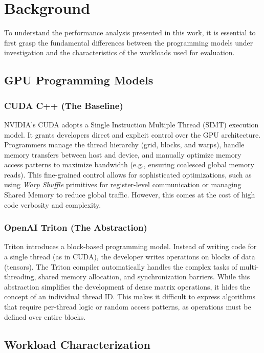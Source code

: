 \section{Background}\label{sec:background}

To understand the performance analysis presented in this work, it is essential to first grasp the fundamental differences between the programming models under investigation and the characteristics of the workloads used for evaluation.

\subsection{GPU Programming Models}

\subsubsection{CUDA C++ (The Baseline)}
NVIDIA's CUDA \cite{cuda} adopts a Single Instruction Multiple Thread (SIMT) execution model. It grants developers direct and explicit control over the GPU architecture. Programmers manage the thread hierarchy (grid, blocks, and warps), handle memory transfers between host and device, and manually optimize memory access patterns to maximize bandwidth (e.g., ensuring coalesced global memory reads).
This fine-grained control allows for sophisticated optimizations, such as using \textit{Warp Shuffle} primitives for register-level communication or managing Shared Memory to reduce global traffic. However, this comes at the cost of high code verbosity and complexity.

\subsubsection{OpenAI Triton (The Abstraction)}
Triton \cite{triton} introduces a block-based programming model. Instead of writing code for a single thread (as in CUDA), the developer writes operations on blocks of data (tensors). The Triton compiler automatically handles the complex tasks of multi-threading, shared memory allocation, and synchronization barriers.
While this abstraction simplifies the development of dense matrix operations, it hides the concept of an individual thread ID. This makes it difficult to express algorithms that require per-thread logic or random access patterns, as operations must be defined over entire blocks.

\subsection{Workload Characterization}

